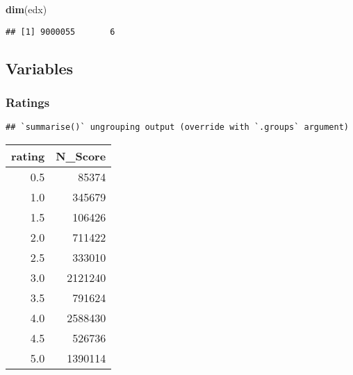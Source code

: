 \documentclass[
]{article}
\newenvironment{Shaded}{\begin{snugshade}}{\end{snugshade}}
\newcommand{\DataTypeTok}[1]{\textcolor[rgb]{0.13,0.29,0.53}{#1}}
\newcommand{\KeywordTok}[1]{\textcolor[rgb]{0.13,0.29,0.53}{\textbf{#1}}}
\newcommand{\NormalTok}[1]{#1}
\newcommand{\OperatorTok}[1]{\textcolor[rgb]{0.81,0.36,0.00}{\textbf{#1}}}
\newcommand{\StringTok}[1]{\textcolor[rgb]{0.31,0.60,0.02}{#1}}
\begin{document}
\begin{Shaded}
\begin{Highlighting}[]
\KeywordTok{dim}\NormalTok{(edx)}
\end{Highlighting}
\end{Shaded}

\begin{verbatim}
## [1] 9000055       6
\end{verbatim}

\hypertarget{variables}{%
\subsection{Variables}\label{variables}}

\hypertarget{ratings}{%
\subsubsection{Ratings}\label{ratings}}

\begin{Shaded}
\end{Shaded}

\begin{verbatim}
## `summarise()` ungrouping output (override with `.groups` argument)
\end{verbatim}

\begin{longtable}[]{@{}rr@{}}
\toprule
rating & N\_Score\tabularnewline
\midrule
\endhead
0.5 & 85374\tabularnewline
1.0 & 345679\tabularnewline
1.5 & 106426\tabularnewline
2.0 & 711422\tabularnewline
2.5 & 333010\tabularnewline
3.0 & 2121240\tabularnewline
3.5 & 791624\tabularnewline
4.0 & 2588430\tabularnewline
4.5 & 526736\tabularnewline
5.0 & 1390114\tabularnewline
\bottomrule
\end{longtable}

\begin{Shaded}
\end{Shaded}
\end{document}
